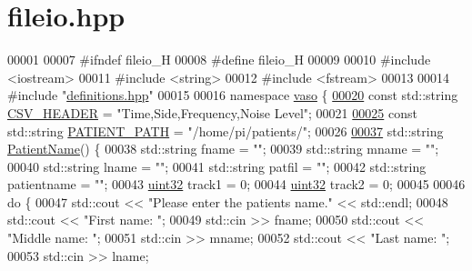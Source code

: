 \hypertarget{fileio_8hpp_source}{\section{fileio.\+hpp}
\label{fileio_8hpp_source}
}

\begin{DoxyCode}
00001 
00007 \textcolor{preprocessor}{#ifndef fileio\_H}
00008 \textcolor{preprocessor}{#define fileio\_H}
00009 
00010 \textcolor{preprocessor}{#include <iostream>}
00011 \textcolor{preprocessor}{#include <string>}
00012 \textcolor{preprocessor}{#include <fstream>}
00013 
00014 \textcolor{preprocessor}{#include "\hyperlink{definitions_8hpp}{definitions.hpp}"}
00015 
00016 \textcolor{keyword}{namespace }\hyperlink{namespacevaso}{vaso} \{
\hypertarget{fileio_8hpp_source_l00020}{}\hyperlink{namespacevaso_ade7cbcaad3dc577b643b3eea4b4e8aa0}{00020}     \textcolor{keyword}{const} std::string \hyperlink{namespacevaso_ade7cbcaad3dc577b643b3eea4b4e8aa0}{CSV\_HEADER} = \textcolor{stringliteral}{"Time,Side,Frequency,Noise Level"};
00021 
\hypertarget{fileio_8hpp_source_l00025}{}\hyperlink{namespacevaso_a0f49c8240a13e7d853912ad78d5f53c9}{00025}     \textcolor{keyword}{const} std::string \hyperlink{namespacevaso_a0f49c8240a13e7d853912ad78d5f53c9}{PATIENT\_PATH} = \textcolor{stringliteral}{"/home/pi/patients/"};
00026 
\hypertarget{fileio_8hpp_source_l00037}{}\hyperlink{namespacevaso_a21e264fa912f7ca3f50e7e412ba1582e}{00037}     std::string \hyperlink{namespacevaso_a21e264fa912f7ca3f50e7e412ba1582e}{PatientName}() \{
00038         std::string fname = \textcolor{stringliteral}{""};
00039         std::string mname = \textcolor{stringliteral}{""};
00040         std::string lname = \textcolor{stringliteral}{""};
00041         std::string patfil = \textcolor{stringliteral}{""};
00042         std::string patientname = \textcolor{stringliteral}{""};
00043         \hyperlink{definitions_8hpp_a1134b580f8da4de94ca6b1de4d37975e}{uint32} track1 = 0;
00044         \hyperlink{definitions_8hpp_a1134b580f8da4de94ca6b1de4d37975e}{uint32} track2 = 0;
00045 
00046         \textcolor{keywordflow}{do} \{
00047             std::cout << \textcolor{stringliteral}{"Please enter the patients name."} << std::endl;
00048             std::cout << \textcolor{stringliteral}{"First name: "};
00049             std::cin >> fname;
00050             std::cout << \textcolor{stringliteral}{"Middle name: "};
00051             std::cin >> mname;
00052             std::cout << \textcolor{stringliteral}{"Last name: "};
00053             std::cin >> lname;

\end{DoxyCode}
